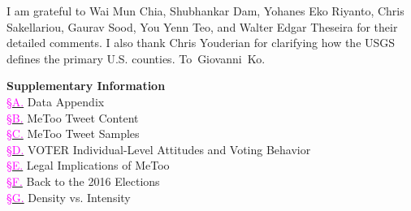 \documentclass[manuscript,screen,nonacm,11pt,acm]{acmart}
\begin{document}
\begin{acks}
I am grateful to Wai Mun Chia, Shubhankar Dam, Yohanes Eko Riyanto, Chris Sakellariou, Gaurav Sood, You Yenn Teo, and Walter Edgar Theseira for their detailed comments. I also thank Chris Youderian for clarifying how the USGS defines the primary U.S. counties. To~Giovanni~Ko.
\end{acks}




\clearpage
\appendix

\vspace{1cm}
\noindent \textbf{Supplementary Information}\\
\hyperref[sm:data]{\indent \textcolor{magenta}{\S A.}} Data Appendix\\
\hyperref[sm:text]{\indent \textcolor{magenta}{\S B.}} MeToo Tweet Content\\
\hyperref[sm:random-samples]{\indent \textcolor{magenta}{\S C.}} MeToo Tweet Samples\\
\hyperref[sm:VOTER]{\indent \textcolor{magenta}{\S D.}} VOTER Individual-Level Attitudes and Voting Behavior\\
\hyperref[sm:legal]{\indent \textcolor{magenta}{\S E.}} Legal Implications of MeToo\\
\hyperref[sm:2016-elections]{\indent \textcolor{magenta}{\S F.}} Back to the 2016 Elections\\
\hyperref[sm:density-intensity]{\indent \textcolor{magenta}{\S G.}} Density vs. Intensity\\

\FloatBarrier
\setcounter{table}{0}
\setcounter{figure}{0}
\setcounter{equation}{0}
\renewcommand{\thetable}{A\arabic{table}}
\renewcommand{\thefigure}{A\arabic{figure}}
\renewcommand{\theequation}{A\arabic{equation}}
\end{document}
